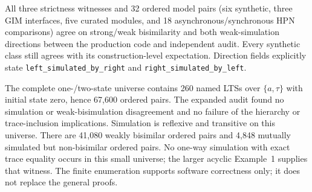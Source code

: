 \documentclass{ws-jbcb}
\numberwithin{equation}{section}
\begin{document}
All three strictness witnesses and 32 ordered model pairs (six synthetic,
three GIM interfaces, five curated modules, and 18 asynchronous/synchronous
HPN comparisons) agree on strong/weak bisimilarity and both weak-simulation
directions between the production code and independent audit. Every synthetic
class still agrees with its construction-level expectation. Direction fields
explicitly state \texttt{left\_simulated\_by\_right} and
\texttt{right\_simulated\_by\_left}.

The complete one-/two-state universe contains 260 named LTSs over
$\{a,\tau\}$ with initial state zero, hence 67,600 ordered pairs. The expanded
audit found no simulation or weak-bisimulation disagreement and no failure of
the hierarchy or trace-inclusion implications. Simulation is reflexive and
transitive on this universe. There are 41,080 weakly bisimilar ordered pairs
and 4,848 mutually simulated but non-bisimilar ordered pairs. No one-way
simulation with exact trace equality occurs in this small universe; the
larger acyclic Example~1 supplies that witness. The finite enumeration
supports software correctness only; it does not replace the general proofs.
\end{document}
